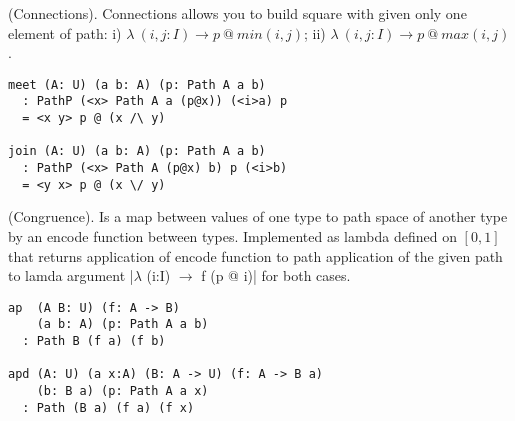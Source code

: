 \documentclass{article}
\begin{document}
\begin{definition} (Connections).
Connections allows you to build square
with given only one element of path: i) $\lambda\ (i,j: I) \rightarrow p\ @\ min(i,j)$;
ii) $\lambda\ (i,j:I) \rightarrow p\ @\ max(i,j)$.
\begin{center}
\end{center}
\begin{lstlisting}
meet (A: U) (a b: A) (p: Path A a b)
  : PathP (<x> Path A a (p@x)) (<i>a) p
  = <x y> p @ (x /\ y)

join (A: U) (a b: A) (p: Path A a b)
  : PathP (<x> Path A (p@x) b) p (<i>b)
  = <y x> p @ (x \/ y)
\end{lstlisting}
\end{definition}

\begin{theorem} (Congruence).
Is a map between values of one type
to path space of another type by an encode function between types.
Implemented as lambda defined on $[0,1]$ that returns
application of encode function to path application of
the given path to lamda argument |$\lambda$ (i:I) $\rightarrow$ f (p @ i)|
for both cases.
\begin{lstlisting}
ap  (A B: U) (f: A -> B)
    (a b: A) (p: Path A a b)
  : Path B (f a) (f b)

apd (A: U) (a x:A) (B: A -> U) (f: A -> B a)
    (b: B a) (p: Path A a x)
  : Path (B a) (f a) (f x)
\end{lstlisting}
\end{theorem}
\end{document}

